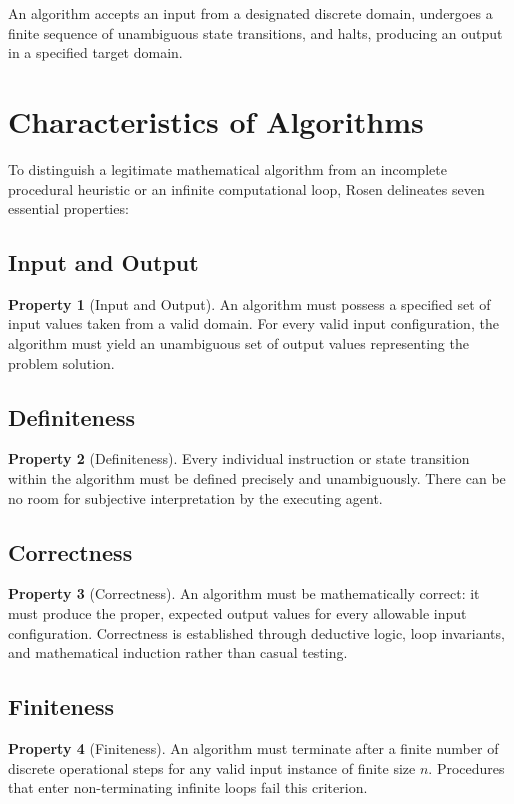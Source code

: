 \documentclass[11pt,a4paper,oneside]{report}
\theoremstyle{definition}
\newtheorem{property}{Property}[chapter]
\begin{document}
An algorithm accepts an input from a designated discrete domain, undergoes a finite sequence of unambiguous state transitions, and halts, producing an output in a specified target domain.

\section{Characteristics of Algorithms}
To distinguish a legitimate mathematical algorithm from an incomplete procedural heuristic or an infinite computational loop, Rosen delineates seven essential properties:

\subsection{Input and Output}
\begin{property}[Input and Output]
An algorithm must possess a specified set of input values taken from a valid domain. For every valid input configuration, the algorithm must yield an unambiguous set of output values representing the problem solution.
\end{property}

\subsection{Definiteness}
\begin{property}[Definiteness]
Every individual instruction or state transition within the algorithm must be defined precisely and unambiguously. There can be no room for subjective interpretation by the executing agent.
\end{property}

\subsection{Correctness}
\begin{property}[Correctness]
An algorithm must be mathematically correct: it must produce the proper, expected output values for every allowable input configuration. Correctness is established through deductive logic, loop invariants, and mathematical induction rather than casual testing.
\end{property}

\subsection{Finiteness}
\begin{property}[Finiteness]
An algorithm must terminate after a finite number of discrete operational steps for any valid input instance of finite size $n$. Procedures that enter non-terminating infinite loops fail this criterion.
\end{property}
\end{document}

